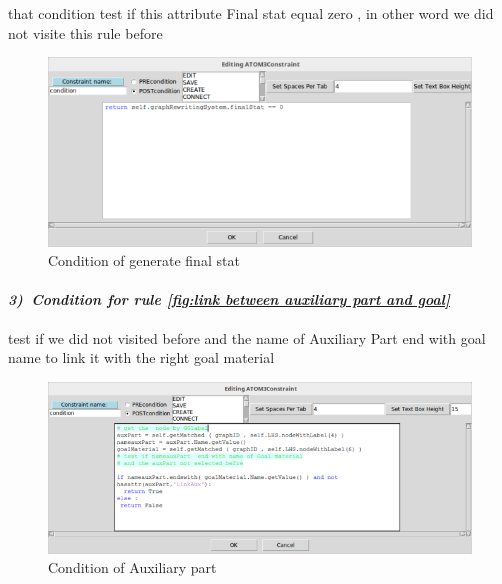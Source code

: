 \vspace{0.5cm}
that condition test if this attribute Final stat equal zero 
, in other word we did not visite this rule before 
 
\vspace{0.5cm}
\begin{figure}[th]
	\centering
 	\includegraphics[scale=0.5]{chapiter3/img/condfinal}
	\caption{\label{fig:Condition of generate final stat } Condition of generate final stat }
\end{figure} 


\vspace{0.5cm}

\paragraph{\emph{3)~Condition for rule \ref{fig:link between auxiliary part and goal} } } 
  
\vspace{0.5cm}
test if we did not visited before  and the name of Auxiliary Part end with goal name to link it with the right goal material
 
 
\vspace{0.5cm}
\begin{figure}[th]
	\centering
 	\includegraphics[scale=0.5]{chapiter3/img/condaux}
	\caption{\label{fig:Condition of Auxiliary part}Condition of Auxiliary part  }
\end{figure} 





